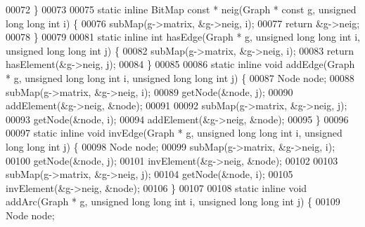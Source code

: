 \begin{DoxyCode}
{00072 \}
00073 
00075 \textcolor{keyword}{static} \textcolor{keyword}{inline} BitMap \textcolor{keyword}{const} * neig(Graph * \textcolor{keyword}{const} g, \textcolor{keywordtype}{unsigned} \textcolor{keywordtype}{long} \textcolor{keywordtype}{long} \textcolor{keywordtype}{int} i) \{
00076         subMap(g->matrix, &g->neig, i);
00077         \textcolor{keywordflow}{return} &g->neig;
00078 \}
00079 
00081 \textcolor{keyword}{static} \textcolor{keyword}{inline} \textcolor{keywordtype}{int} hasEdge(Graph * g, \textcolor{keywordtype}{unsigned} \textcolor{keywordtype}{long} \textcolor{keywordtype}{long} \textcolor{keywordtype}{int} i, \textcolor{keywordtype}{unsigned} \textcolor{keywordtype}{long} \textcolor{keywordtype}{long} \textcolor{keywordtype}{int} j) \{
00082         subMap(g->matrix, &g->neig, i);
00083         \textcolor{keywordflow}{return} hasElement(&g->neig, j);
00084 \}
00085 
00086 \textcolor{keyword}{static} \textcolor{keyword}{inline} \textcolor{keywordtype}{void} addEdge(Graph * g, \textcolor{keywordtype}{unsigned} \textcolor{keywordtype}{long} \textcolor{keywordtype}{long} \textcolor{keywordtype}{int} i, \textcolor{keywordtype}{unsigned} \textcolor{keywordtype}{long} \textcolor{keywordtype}{long} \textcolor{keywordtype}{int} j) \{
00087         Node node;
00088         subMap(g->matrix, &g->neig, i);
00089         getNode(&node, j);
00090         addElement(&g->neig, &node);
00091 
00092         subMap(g->matrix, &g->neig, j);
00093         getNode(&node, i);
00094         addElement(&g->neig, &node);
00095 \}
00096 
00097 \textcolor{keyword}{static} \textcolor{keyword}{inline} \textcolor{keywordtype}{void} invEdge(Graph * g, \textcolor{keywordtype}{unsigned} \textcolor{keywordtype}{long} \textcolor{keywordtype}{long} \textcolor{keywordtype}{int} i, \textcolor{keywordtype}{unsigned} \textcolor{keywordtype}{long} \textcolor{keywordtype}{long} \textcolor{keywordtype}{int} j) \{
00098         Node node;
00099         subMap(g->matrix, &g->neig, i);
00100         getNode(&node, j);
00101         invElement(&g->neig, &node);
00102 
00103         subMap(g->matrix, &g->neig, j);
00104         getNode(&node, i);
00105         invElement(&g->neig, &node);
00106 \}
00107 
00108 \textcolor{keyword}{static} \textcolor{keyword}{inline} \textcolor{keywordtype}{void} addArc(Graph * g, \textcolor{keywordtype}{unsigned} \textcolor{keywordtype}{long} \textcolor{keywordtype}{long} \textcolor{keywordtype}{int} i, \textcolor{keywordtype}{unsigned} \textcolor{keywordtype}{long} \textcolor{keywordtype}{long} \textcolor{keywordtype}{int} j) \{
00109         Node node;
}
\end{DoxyCode}
